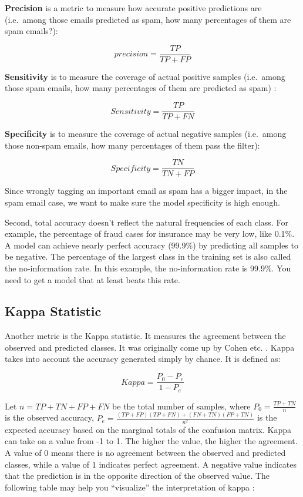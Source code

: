 \documentclass[
  12pt,
]{krantz}
\begin{document}
\textbf{Precision} is a metric to measure how accurate positive predictions are (i.e.~among those emails predicted as spam, how many percentages of them are spam emails?):

\[precision = \frac{TP}{TP+FP}\]

\textbf{Sensitivity} is to measure the coverage of actual positive samples (i.e.~among those spam emails, how many percentages of them are predicted as spam) :

\[Sensitivity = \frac{TP}{TP+FN}\]

\textbf{Specificity} is to measure the coverage of actual negative samples (i.e.~among those non-spam emails, how many percentages of them pass the filter):

\[Specificity = \frac{TN}{TN+FP}\]

Since wrongly tagging an important email as spam has a bigger impact, in the spam email case, we want to make sure the model specificity is high enough.

Second, total accuracy doesn't reflect the natural frequencies of each class. For example, the percentage of fraud cases for insurance may be very low, like 0.1\%. A model can achieve nearly perfect accuracy (99.9\%) by predicting all samples to be negative. The percentage of the largest class in the training set is also called the no-information rate. In this example, the no-information rate is 99.9\%. You need to get a model that at least beats this rate.

\hypertarget{kappa-statistic}{%
\subsection{Kappa Statistic}\label{kappa-statistic}}

Another metric is the Kappa statistic. It measures the agreement between the observed and predicted classes. It was originally come up by Cohen etc. \citep{Cohen1960}. Kappa takes into account the accuracy generated simply by chance. It is defined as:

\[Kappa=\frac{P_{0}-P_{e}}{1-P_{e}}\]

Let \(n=TP+TN+FP+FN\) be the total number of samples, where \(P_{0}=\frac{TP+TN}{n}\) is the observed accuracy, \(P_{e}=\frac{(TP+FP)(TP+FN)+(FN+TN)(FP+TN)}{n^{2}}\) is the expected accuracy based on the marginal totals of the confusion matrix. Kappa can take on a value from -1 to 1. The higher the value, the higher the agreement. A value of 0 means there is no agreement between the observed and predicted classes, while a value of 1 indicates perfect agreement. A negative value indicates that the prediction is in the opposite direction of the observed value. The following table may help you ``visualize'' the interpretation of kappa \citep{landis1977}:
\end{document}

